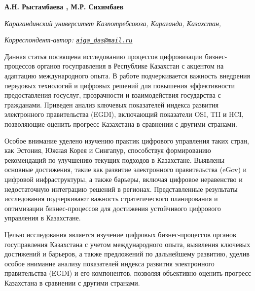 
\begin{articleheader}

{\bfseries  
А.Н. Рыстамбаева\textsuperscript{\envelope } \authorid,
М.Р. Сихимбаев\authorid}
\end{articleheader}

\begin{affiliation}
\emph{Карагандинский университет Казпотребсоюза, Караганда, Казахстан,}

\raggedright \textsuperscript{\envelope }{\em Корреспондент-автор: \href{mailto:aiga_das@mail.ru}{\nolinkurl{aiga\_das@mail.ru}}}
\end{affiliation}

Данная статья посвящена исследованию процессов цифровизации
бизнес-процессов органов госуправления в Республике Казахстан с акцентом
на адаптацию международного опыта. В работе подчеркивается важность
внедрения передовых технологий и цифровых решений для повышения
эффективности предоставления госуслуг, прозрачности и взаимодействия
государства с гражданами. Приведен анализ ключевых показателей индекса
развития электронного правительства (EGDI), включающий показатели OSI,
TII и HCI, позволяющие оценить прогресс Казахстана в сравнении с другими
странами.

Особое внимание уделено изучению практик цифрового управления таких
стран, как Эстония, Южная Корея и Сингапур, способствуя формированию
рекомендаций по улучшению текущих подходов в Казахстане. Выявлены
основные достижения, такие как развитие электронного правительства
(eGov) и цифровой инфраструктуры, а также барьеры, включая цифровое
неравенство и недостаточную интеграцию решений в регионах.
Представленные результаты исследования подчеркивают важность
стратегического планирования и оптимизации бизнес-процессов для
достижения устойчивого цифрового управления в Казахстане.

Целью исследования является изучение цифровых бизнес-процессов органов
госуправления Казахстана с учетом международного опыта, выявления
ключевых достижений и барьеров, а также предложений по дальнейшему
развитию, уделив особое внимание анализу показателей индекса развития
электронного правительства (EGDI) и его компонентов, позволяя объективно
оценить прогресс Казахстана в сравнении с другими странами.

